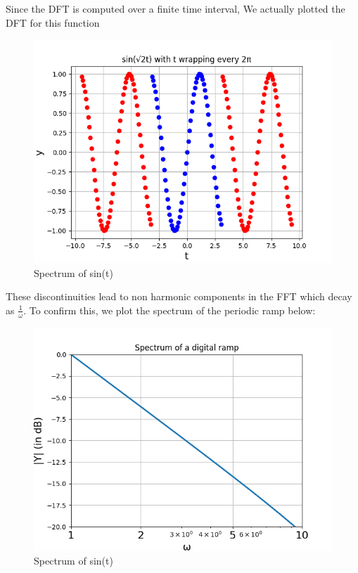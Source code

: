 \documentclass{article}
\begin{document}
Since the DFT is computed over a finite time interval, We actually plotted the DFT for this function
\begin{figure}[h!]
\centering
\includegraphics[scale=0.6]{fig10-3.png}
\caption{Spectrum of sin(t)}
\label{fig:universe}
\end{figure}

These discontinuities lead to  non harmonic components in the FFT which decay as \(\frac{1}{\omega}\). To confirm
this, we plot the spectrum of the periodic ramp below:
\begin{figure}[h!]
\centering
\includegraphics[scale=0.6]{fig10-4.png}
\caption{Spectrum of sin(t)}
\label{fig:universe}
\end{figure}
\end{document}

